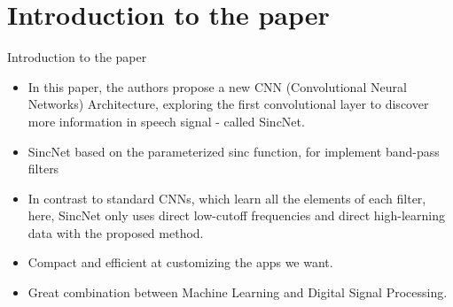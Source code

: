 \documentclass[11pt]{beamer}
\begin{document}
\section{Introduction to the paper}
\begin{frame}{Introduction to the paper}
	\begin{itemize}
		\item In this paper, the authors propose a new CNN (Convolutional Neural Networks) Architecture, exploring the first convolutional layer to discover more information in speech signal - called SincNet.
		\item SincNet based on the  parameterized sinc function, for implement band-pass filters
		\item In contrast to standard CNNs, which learn all the elements of each filter, here, SincNet only uses direct low-cutoff frequencies and direct high-learning data with the proposed method.
		\item Compact and efficient at customizing the apps we want.
		\item Great combination between Machine Learning and Digital Signal Processing.
	\end{itemize}
\end{frame}
\end{document}
